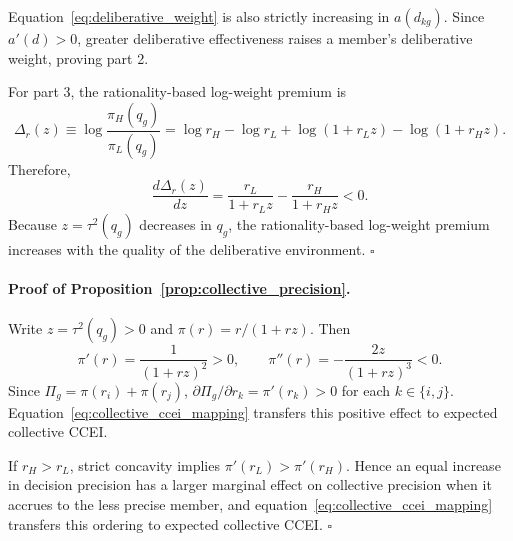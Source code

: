 \documentclass[11 pt]{article}
\begin{document}
Equation~\eqref{eq:deliberative_weight} is also strictly increasing in $a(d_{kg})$. Since $a'(d)>0$, greater deliberative effectiveness raises a member's deliberative weight, proving part 2.

For part 3, the rationality-based log-weight premium is
\begin{equation}
    \Delta_r(z)\equiv\log\frac{\pi_H(q_g)}{\pi_L(q_g)}=
    \log r_H-\log r_L+\log(1+r_Lz)-\log(1+r_Hz).
    \label{eq:rationality_premium}
\end{equation}
Therefore,
\begin{equation}
    \frac{d\Delta_r(z)}{dz}=
    \frac{r_L}{1+r_Lz}-\frac{r_H}{1+r_Hz}<0.
    \label{eq:rationality_premium_derivative}
\end{equation}
Because $z=\tau^2(q_g)$ decreases in $q_g$, the rationality-based log-weight premium increases with the quality of the deliberative environment. \hfill$\square$



\paragraph{Proof of Proposition~\ref{prop:collective_precision}.}
Write $z=\tau^2(q_g)>0$ and $\pi(r)=r/(1+rz)$. Then
\begin{equation}
    \pi'(r)=\frac{1}{(1+rz)^2}>0, \qquad
    \pi''(r)=-\frac{2z}{(1+rz)^3}<0.
    \label{eq:pi_concavity}
\end{equation}
Since $\Pi_g=\pi(r_i)+\pi(r_j)$, $\partial\Pi_g/\partial r_k=\pi'(r_k)>0$ for each $k\in\{i,j\}$. Equation~\eqref{eq:collective_ccei_mapping} transfers this positive effect to expected collective CCEI.

If $r_H>r_L$, strict concavity implies $\pi'(r_L)>\pi'(r_H)$. Hence an equal increase in decision precision has a larger marginal effect on collective precision when it accrues to the less precise member, and equation~\eqref{eq:collective_ccei_mapping} transfers this ordering to expected collective CCEI. \hfill$\square$
\end{document}
